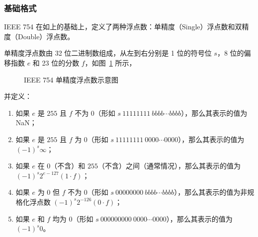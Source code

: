         \subsubsection{基础格式}\label{subsubsec:NumberSystemBasics/fixed-point-and-floating-point/ieee-754/basic-format}
            IEEE 754 在如上的基础上，定义了两种浮点数：单精度（Single）浮点数和双精度（Double）浮点数。

            单精度浮点数由 32 位二进制数组成，从左到右分别是 1 位的符号位 $s$，8 位的偏移指数 $e$ 和 23 位的分数 $f$，如图~\ref{fig:NumberSystemBasics/fixed-point-and-floating-point/ieee-754/basic-format/single} 所示，
            \begin{figure}
                \centering
                \caption{IEEE 754 单精度浮点数示意图}
                \label{fig:NumberSystemBasics/fixed-point-and-floating-point/ieee-754/basic-format/single}
            \end{figure}

            并定义：
            \begin{enumerate}
                \item 如果 $e$ 是 $255$ 且 $f$ 不为 $0$（形如 $s\ 11111111\ bbbb \cdots bbbb$），那么其表示的值为 NaN；
                \item 如果 $e$ 是 $255$ 且 $f$ 为 $0$（形如 $s\ 11111111\ 0000 \cdots 0000$），那么其表示的值为 $(-1)^s\infty$；
                \item 如果 $e$ 在 $0$（不含）和 $255$（不含）之间（通常情况），那么其表示的值为 $(-1)^s2^{e-127}(1 \cdot f)$；
                \item 如果 $e$ 为 $0$ 但 $f$ 不为 $0$（形如 $s\ 00000000\ bbbb \cdots bbbb$），那么其表示的值为非规格化浮点数 $(-1)^s2^{-126}(0 \cdot f)$；
                \item 如果 $e$ 和 $f$ 均为 $0$（形如 $s\ 000000000\ 0000 \cdots 0000$），那么其表示的值为 $(-1)^s0$。
            \end{enumerate}

